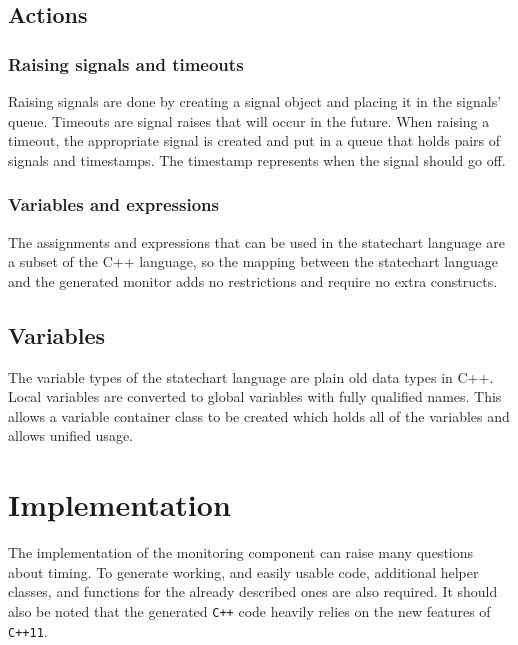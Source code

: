 {  \subsection{Actions}
    \subsubsection{Raising signals and timeouts}
Raising signals are done by creating a signal object and placing it in the signals' queue. Timeouts are signal raises that will occur in the future. When raising a timeout, the appropriate signal is created and put in a queue that holds pairs of signals and timestamps. The timestamp represents when the signal should go off.
    \subsubsection{Variables and expressions}
The assignments and expressions that can be used in the statechart language are a subset of the C++ language, so the mapping between the statechart language and the generated monitor adds no restrictions and require no extra constructs.
  \subsection{Variables}
The variable types of the statechart language are plain old data types in C++. Local variables are converted to global variables with fully qualified names. This allows a variable container class to be created which holds all of the variables and allows unified usage.
\section{Implementation}
The implementation of the monitoring component can raise many questions about timing. To generate working, and easily usable code, additional helper classes, and functions for the already described ones are also required. It should also be noted that the generated \verb!C++! code heavily relies on the new features of \verb!C++11!.
}
